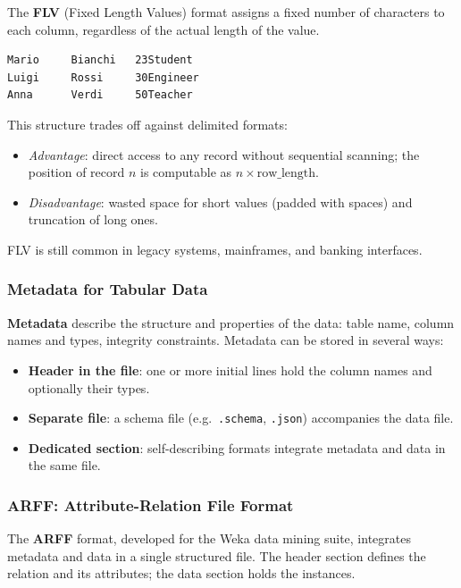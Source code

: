 The \textbf{FLV} (Fixed Length Values) format assigns a fixed number of characters to each column, regardless of the actual length of the value.

\begin{lstlisting}[language={}, basicstyle=\ttfamily\scriptsize]
Mario     Bianchi   23Student  
Luigi     Rossi     30Engineer 
Anna      Verdi     50Teacher  
\end{lstlisting}

This structure trades off against delimited formats:

\begin{itemize}
    \item \textit{Advantage}: direct access to any record without sequential scanning; the position of record $n$ is computable as $n \times \text{row\_length}$.
    \item \textit{Disadvantage}: wasted space for short values (padded with spaces) and truncation of long ones.
\end{itemize}

FLV is still common in legacy systems, mainframes, and banking interfaces.

\subsubsection{Metadata for Tabular Data}
\label{subsec:tabular-metadata}

\textbf{Metadata} describe the structure and properties of the data: table name, column names and types, integrity constraints. Metadata can be stored in several ways:

\begin{itemize}
    \item \textbf{Header in the file}: one or more initial lines hold the column names and optionally their types.
    \item \textbf{Separate file}: a schema file (e.g.\ \texttt{.schema}, \texttt{.json}) accompanies the data file.
    \item \textbf{Dedicated section}: self-describing formats integrate metadata and data in the same file.
\end{itemize}


\subsubsection{ARFF: Attribute-Relation File Format}
\label{subsec:arff-format}

The \textbf{ARFF} format, developed for the Weka data mining suite, integrates metadata and data in a single structured file. The header section defines the relation and its attributes; the data section holds the instances.

